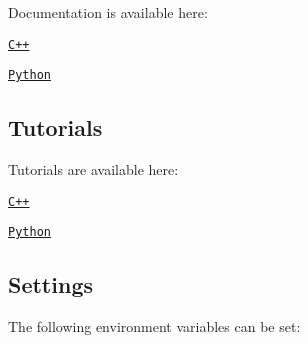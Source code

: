 Documentation is available here\+:


\begin{DoxyItemize}
\item \href{https://open-space-collective.github.io/open-space-toolkit-physics}{\tt C++}
\item \href{./bindings/python/docs}{\tt Python}
\end{DoxyItemize}

\subsection*{Tutorials}

Tutorials are available here\+:


\begin{DoxyItemize}
\item \href{./tutorials/cpp}{\tt C++}
\item \href{./tutorials/python}{\tt Python}
\end{DoxyItemize}

\subsection*{Settings}

The following environment variables can be set\+:


